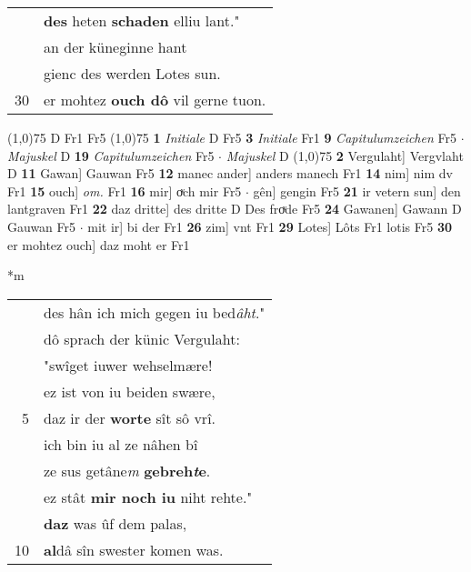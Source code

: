 \documentclass[8pt,a4paper,notitlepage]{article}
\begin{document}
\begin{table}[ht]
\begin{minipage}[t]{0.5\linewidth}
\begin{tabular}{rl}
 & \textbf{des} heten \textbf{schaden} elliu lant."\\ 
 & an der küneginne hant\\ 
 & gienc des werden Lotes sun.\\ 
30 & er mohtez \textbf{ouch dô} vil gerne tuon.\\ 
\end{tabular}
\scriptsize
\line(1,0){75} \newline
D Fr1 Fr5 \newline
\line(1,0){75} \newline
\textbf{1} \textit{Initiale} D Fr5  \textbf{3} \textit{Initiale} Fr1  \textbf{9} \textit{Capitulumzeichen} Fr5   $\cdot$ \textit{Majuskel} D  \textbf{19} \textit{Capitulumzeichen} Fr5   $\cdot$ \textit{Majuskel} D  \newline
\line(1,0){75} \newline
\textbf{2} Vergulaht] Vergvlaht D \textbf{11} Gawan] Gauwan Fr5 \textbf{12} manec ander] anders manech Fr1 \textbf{14} nim] nim dv Fr1 \textbf{15} ouch] \textit{om.} Fr1 \textbf{16} mir] oͮch mir Fr5  $\cdot$ gên] gengin Fr5 \textbf{21} ir vetern sun] den lantgraven Fr1 \textbf{22} daz dritte] des dritte D Des froͮde Fr5 \textbf{24} Gawanen] Gawann D Gauwan Fr5  $\cdot$ mit ir] bi der Fr1 \textbf{26} zim] vnt Fr1 \textbf{29} Lotes] Lôts Fr1 lotis Fr5 \textbf{30} er mohtez ouch] daz moht er Fr1 \newline
\end{minipage}
\hspace{0.5cm}
\begin{minipage}[t]{0.5\linewidth}
\small
\begin{center}*m
\end{center}
\begin{tabular}{rl}
 & des hân ich mich gegen iu bed\textit{âht}."\\ 
 & dô sprach der künic Vergulaht:\\ 
 & "swîget iuwer wehselmære!\\ 
 & ez ist von iu beiden swære,\\ 
5 & daz ir der \textbf{worte} sît sô vrî.\\ 
 & ich bin iu al ze nâhen bî\\ 
 & ze sus getâne\textit{m} \textbf{gebreh\textit{t}e}.\\ 
 & ez stât \textbf{mir noch iu} niht rehte."\\ 
 & \textbf{daz} was ûf dem palas,\\ 
10 & \textbf{al}dâ sîn swester komen was.\\ 

\end{tabular}
\end{minipage}
\end{table}
\end{document}
